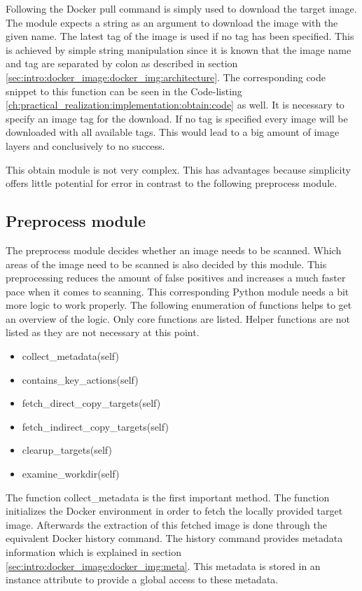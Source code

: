 Following the Docker pull command is simply used to download the target image. 
The module expects a string as an argument to download the image with the given name.
The latest tag of the image is used if no tag has been specified. 
This is achieved by simple string manipulation since it is known that the image name and tag are separated by colon as described in section \ref{sec:intro:docker_image:docker_img:architecture}.
The corresponding code snippet to this function can be seen in the Code-listing \ref{ch:practical_realization:implementation:obtain:code} as well.
It is necessary to specify an image tag for the download.
If no tag is specified every image will be downloaded with all available tags.
This would lead to a big amount of image layers and conclusively to no success.

This obtain module is not very complex. 
This has advantages because simplicity offers little potential for error in contrast to the following preprocess module.

\subsection{Preprocess module}
\label{ch:practical_realization:implementation:preprocessing}
The preprocess module decides whether an image needs to be scanned.
Which areas of the image need to be scanned is also decided by this module.
This preprocessing reduces the amount of false positives and increases a much faster pace when it comes to scanning.	
This corresponding Python module needs a bit more logic to work properly. 
The following enumeration of functions helps to get an overview of the logic. 
Only core functions are listed.
Helper functions are not listed as they are not necessary at this point.
\begin{itemize}
\item collect\_metadata(self)
\item contains\_key\_actions(self)
\item fetch\_direct\_copy\_targets(self)
\item fetch\_indirect\_copy\_targets(self)
\item clearup\_targets(self)
\item examine\_workdir(self)
\end{itemize}
The function collect\_metadata is the first important method. 
The function initializes the Docker environment in order to fetch the locally provided target image. 
Afterwards the extraction of this fetched image is done through the equivalent Docker history command. 
The history command provides metadata information which is explained in section \ref{sec:intro:docker_image:docker_img:meta}. 
This metadata is stored in an instance attribute to provide a global access to these metadata.

